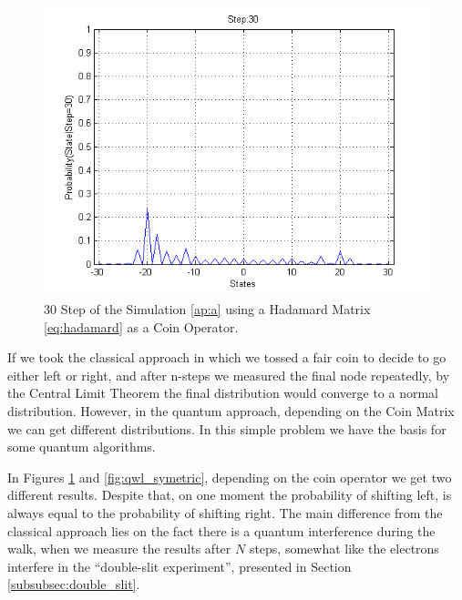 \begin{figure}[h]
\centering 
\includegraphics[scale=0.50]{Figures/quantum_walk_line_hadamard.png}
\caption{30 Step of the Simulation \ref{ap:a} using a Hadamard Matrix \eqref{eq:hadamard} as a Coin Operator.}
\label{fig:qwl_hadamard}
\end{figure}

If we took the classical approach in which we tossed a fair coin to decide to go either left or right, and after n-steps we measured the final node repeatedly, by the %
Central Limit Theorem the final distribution would converge to a normal distribution. However, in the quantum approach, depending on the Coin Matrix we can get different distributions. In this simple problem we have the basis for some quantum algorithms. 

In Figures \ref{fig:qwl_hadamard} and \ref{fig:qwl_symetric}, depending on the coin operator we get two different results. Despite that, on one moment the  probability of shifting left, is always equal to the probability of shifting right. The main difference from the classical approach  lies on the fact there is a quantum interference during the walk, when we measure the results after $N$ steps, somewhat like the electrons interfere in the ``double-slit experiment'', presented in Section \ref{subsubsec:double_slit}. 


